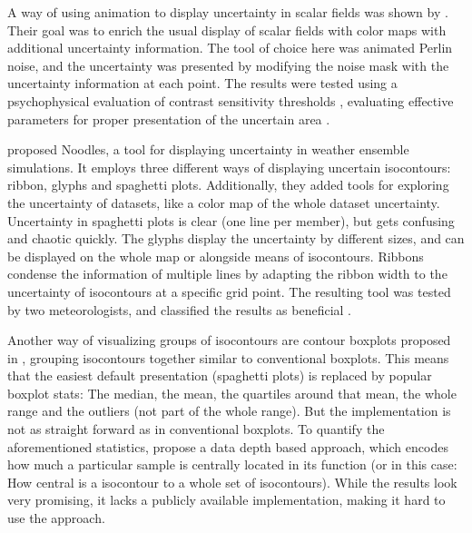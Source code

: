 A way of using animation to display uncertainty in scalar fields was shown by \citeauthor{coninx_visualization_2011}. 
Their goal was to enrich the usual display of scalar fields with color maps with additional uncertainty information. 
The tool of choice here was animated Perlin noise, and the uncertainty was presented by modifying the noise mask with the uncertainty information at each point. 
The results were tested using a psychophysical evaluation of contrast sensitivity thresholds \cite{coninx_visualization_2011}, evaluating effective parameters for proper presentation of the uncertain area \cite{coninx_visualization_2011}.

\citeauthor{sanyal_noodles_2010} proposed Noodles, a tool for displaying uncertainty in weather ensemble simulations. 
It employs three different ways of displaying uncertain isocontours: ribbon, glyphs and spaghetti plots. 
Additionally, they added tools for exploring the uncertainty of datasets, like a color map of the whole dataset uncertainty.  
Uncertainty in spaghetti plots is clear (one line per member), but gets confusing and chaotic quickly. 
The glyphs display the uncertainty by different sizes,  and can be displayed on the whole map or alongside means of isocontours. 
Ribbons condense the information of multiple lines by adapting the ribbon width to the uncertainty of isocontours at a specific grid point. 
The resulting tool was tested by two meteorologists, and classified the results as beneficial \cite{sanyal_noodles_2010}.  


Another way of visualizing groups of isocontours are contour boxplots proposed in \cite{whitaker_contour_2013}, grouping isocontours together similar to conventional boxplots. 
This means that the easiest default presentation (spaghetti plots) is replaced by popular boxplot stats: The median, the mean, the quartiles around that mean, the whole range and the outliers (not part of the whole range). 
But the implementation is not as straight forward as in conventional boxplots. 
To quantify the aforementioned statistics, \citeauthor{whitaker_contour_2013} propose a data depth based approach, which encodes how much a particular sample is centrally located in its function (or in this case: How central is a isocontour to a whole set of isocontours). 
While the results look very promising, it lacks a publicly available implementation, making it hard to use the approach.

%
%
%
%


